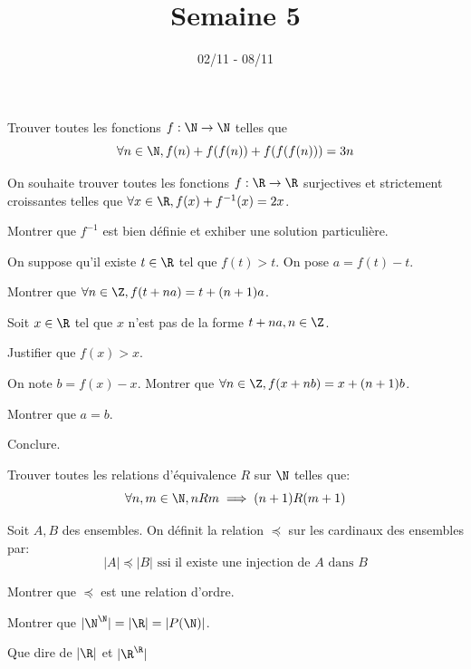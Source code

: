 \documentclass[11pt,a4paper]{article}
\begin{document}
\title{Semaine 5}
\author{}
\date{02/11 - 08/11 }

\maketitle

\begin{exercise}
Trouver toutes les fonctions $f:\N\to\N$ telles que
$$\forall n\in\N, f(n)+f(f(n))+f(f(f(n)))=3n$$
\end{exercise}

\begin{exercise}
On souhaite trouver toutes les fonctions $f:\R\to\R$ surjectives et strictement croissantes
 telles que $\forall x\in\R, f(x)+f^{-1}(x)=2x$.
\begin{questions}
\item Montrer que $f^{-1}$ est bien définie et exhiber une solution particulière.
\item On suppose qu'il existe $t\in\R$ tel que $f(t)\gt t$. On pose $a=f(t)-t$.
    \begin{questions}
    \item Montrer que $\forall n\in\Z, f(t+na)=t+(n+1)a$.
    \item Soit $x\in\R$ tel que $x$ n'est pas de la forme $t+na, n\in\Z$.
        \begin{questions}
        \item Justifier que $f(x)\gt x$.
        \item On note $b=f(x)-x$. Montrer que $\forall n\in\Z, f(x+nb)=x+(n+1)b$.
        \item Montrer que $a=b$.
        \end{questions}
    \end{questions}
\item Conclure.
\end{questions} 
\end{exercise}

\begin{exercise}
Trouver toutes les relations d'équivalence $R$ sur $\N$ telles que: 
$$\forall n,m\in\N, nRm\implies (n+1)R(m+1)$$
\end{exercise}

\begin{exercise}
Soit $A,B$ des ensembles.
On définit la relation $\preceq$ sur les cardinaux des ensembles par:
$$|A|\preceq |B|\text{ ssi il existe une injection de $A$ dans $B$}$$
\begin{questions}
\item Montrer que $\preceq$ est une relation d'ordre.
\item Montrer que $|\N^{\N}|=|\R|=|P(\N)|$.
\item Que dire de $|\R|$ et $|\R^{\R}|$
\end{questions}
\end{exercise}
\end{document}
